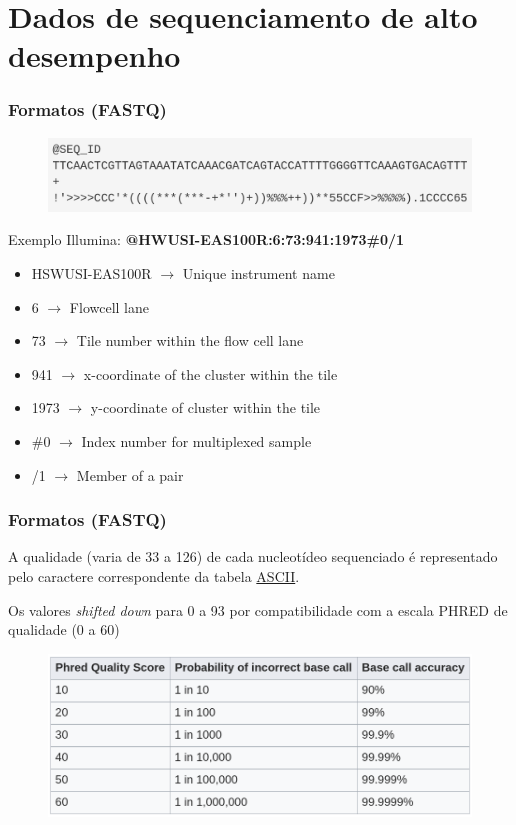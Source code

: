 \documentclass{beamer}
\begin{document}
	\section{Dados de sequenciamento de alto desempenho}
	
	\begin{frame}\frametitle{Formatos (FASTQ)}
		\begin{figure}[ht]
			\centering
			\includegraphics[width=\textwidth]{img/fastq.png}
		\end{figure}
			Exemplo Illumina: \textbf{@HWUSI-EAS100R:6:73:941:1973\#0/1}
			\begin{itemize}
				\item HSWUSI-EAS100R $\rightarrow$ Unique instrument name
				\item 6 $\rightarrow$ Flowcell lane
				\item 73 $\rightarrow$ Tile number within the flow cell lane
				\item 941 $\rightarrow$ x-coordinate of the cluster within the tile
				\item 1973 $\rightarrow$ y-coordinate of cluster within the tile
				\item \#0 $\rightarrow$ Index number for multiplexed sample
				\item /1 $\rightarrow$ Member of a pair
			\end{itemize}
	\end{frame}
	
	\begin{frame}\frametitle{Formatos (FASTQ)}		
		A qualidade (varia de 33 a 126) de cada nucleotídeo sequenciado é representado pelo caractere correspondente da tabela \href{https://upload.wikimedia.org/wikipedia/commons/1/1b/ASCII-Table-wide.svg}{ASCII}.
		
		Os valores \textit{shifted down} para 0 a 93 por compatibilidade com a escala PHRED de qualidade (0 a 60)		
		\begin{figure}[ht]
			\centering
			\includegraphics[scale=0.3]{img/phred.png}
		\end{figure}
	\end{frame}
\end{document}
